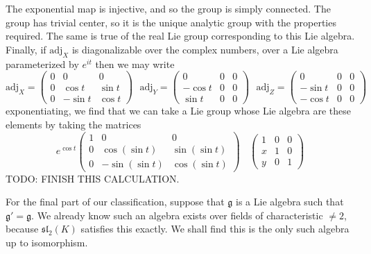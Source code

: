 The exponential map is injective, and so the group is simply connected. The group has trivial center, so it is the unique analytic group with the properties required. The same is true of the real Lie group corresponding to this Lie algebra. Finally, if $\text{adj}_X$ is diagonalizable over the complex numbers, over a Lie algebra parameterized by $e^{it}$ then we may write
%
\[ \text{adj}_X = \begin{pmatrix} 0 & 0 & 0 \\ 0 & \cos t & \sin t \\ 0 & -\sin t & \cos t \end{pmatrix}\ \ \ \text{adj}_Y = \begin{pmatrix} 0 & 0 & 0 \\ -\cos t & 0 & 0 \\ \sin t & 0 & 0 \end{pmatrix}\ \ \ \text{adj}_Z = \begin{pmatrix} 0 & 0 & 0 \\ -\sin t & 0 & 0 \\ - \cos t & 0 & 0 \end{pmatrix} \]
%
exponentiating, we find that we can take a Lie group whose Lie algebra are these elements by taking the matrices
%
\[ e^{\cos t} \begin{pmatrix} 1 & 0 & 0 \\ 0 & \cos(\sin t) & \sin(\sin t) \\ 0 & - \sin(\sin t) & \cos(\sin t) \end{pmatrix}\ \ \ \ \begin{pmatrix} 1 & 0 & 0 \\ x & 1 & 0 \\ y & 0 & 1 \end{pmatrix} \]
%
TODO: FINISH THIS CALCULATION.

For the final part of our classification, suppose that $\mathfrak{g}$ is a Lie algebra such that $\mathfrak{g}' = \mathfrak{g}$. We already know such an algebra exists over fields of characteristic $\neq 2$, because $\mathfrak{sl}_2(K)$ satisfies this exactly. We shall find this is the only such algebra up to isomorphism.


